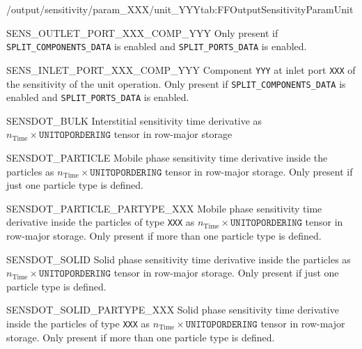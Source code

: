 \begin{groupscope}{/output/sensitivity/param\_XXX/unit\_YYY}{tab:FFOutputSensitivityParamUnit}
\begin{dataset}[type=double,unit={\si{\mol\per\cubic\metre\of{IV}\per\ParamUnit}}]{SENS\_OUTLET\_PORT\_XXX\_COMP\_YYY}
    Only present if \texttt{SPLIT\_COMPONENTS\_DATA} is enabled and \texttt{SPLIT\_PORTS\_DATA} is enabled.
  \end{dataset}
  \begin{dataset}[type=double,unit={\si{\mol\per\cubic\metre\of{IV}\per\ParamUnit}}]{SENS\_INLET\_PORT\_XXX\_COMP\_YYY}
    Component \texttt{YYY} at inlet port \texttt{XXX} of the sensitivity of the unit operation.
    Only present if \texttt{SPLIT\_COMPONENTS\_DATA} is enabled and \texttt{SPLIT\_PORTS\_DATA} is enabled.
  \end{dataset}
  \begin{dataset}[type=double,unit={\si{\mol\per\cubic\metre\of{IV}\per\second\per\ParamUnit}}]{SENSDOT\_BULK}
    Interstitial sensitivity time derivative as $n_{\text{Time}} \times \texttt{UNITOPORDERING}$ tensor in row-major storage
  \end{dataset}
  \begin{dataset}[type=double,unit={\si{\mol\per\cubic\metre\of{MP}\per\second\per\ParamUnit}}]{SENSDOT\_PARTICLE}
    Mobile phase sensitivity time derivative inside the particles as $n_{\text{Time}} \times \texttt{UNITOPORDERING}$ tensor in row-major storage.
    Only present if just one particle type is defined.
  \end{dataset}
  \begin{dataset}[type=double,unit={\si{\mol\per\cubic\metre\of{MP}\per\second\per\ParamUnit}}]{SENSDOT\_PARTICLE\_PARTYPE\_XXX}
    Mobile phase sensitivity time derivative inside the particles of type \texttt{XXX} as $n_{\text{Time}} \times \texttt{UNITOPORDERING}$ tensor in row-major storage.
    Only present if more than one particle type is defined.
  \end{dataset}
  \begin{dataset}[type=double,unit={\si{\mol\per\cubic\metre\of{MP}\per\second\per\ParamUnit}}]{SENSDOT\_SOLID}
    Solid phase sensitivity time derivative inside the particles as $n_{\text{Time}} \times \texttt{UNITOPORDERING}$ tensor in row-major storage.
    Only present if just one particle type is defined.
  \end{dataset}
  \begin{dataset}[type=double,unit={\si{\mol\per\cubic\metre\of{SP}\per\second\per\ParamUnit}}]{SENSDOT\_SOLID\_PARTYPE\_XXX}
    Solid phase sensitivity time derivative inside the particles of type \texttt{XXX} as $n_{\text{Time}} \times \texttt{UNITOPORDERING}$ tensor in row-major storage.
    Only present if more than one particle type is defined.
  \end{dataset}

\end{groupscope}
